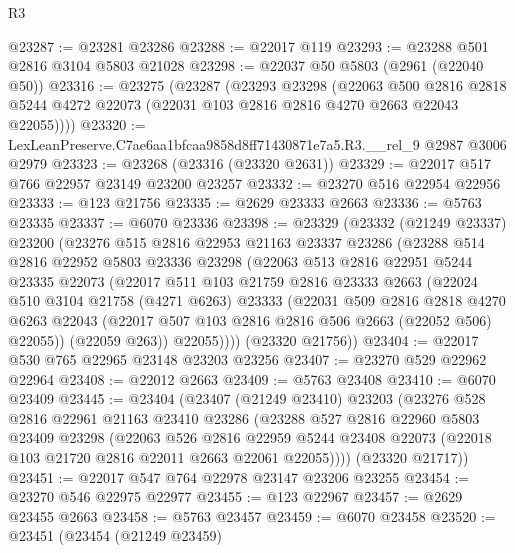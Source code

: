 \begin{lexlean}{R3}
\begin{coremodule}
@23287 := @23281 @23286
@23288 := @22017 @119
@23293 := @23288 @501 @2816 @3104 @5803 @21028
@23298 := @22037 @50 @5803 (@2961 (@22040 @50))
@23316 := @23275
    (@23287
      (@23293
        @23298
        (@22063
          @500
          @2816
          @2818
          @5244
          @4272
          @22073
          (@22031 @103 @2816 @2816 @4270 @2663 @22043 @22055))))
@23320 := LexLeanPreserve.C7ae6aa1bfcaa9858d8ff71430871e7a5.R3.__rel_9 @2987 @3006 @2979
@23323 := @23268 (@23316 (@23320 @2631))
@23329 := @22017 @517 @766 @22957 @23149 @23200 @23257
@23332 := @23270 @516 @22954 @22956
@23333 := @123 @21756
@23335 := @2629 @23333 @2663
@23336 := @5763 @23335
@23337 := @6070 @23336
@23398 := @23329
    (@23332
      (@21249 @23337)
      @23200
      (@23276
        @515
        @2816
        @22953
        @21163
        @23337
        @23286
        (@23288
          @514
          @2816
          @22952
          @5803
          @23336
          @23298
          (@22063
            @513
            @2816
            @22951
            @5244
            @23335
            @22073
            (@22017
              @511
              @103
              @21759
              @2816
              @23333
              @2663
              (@22024
                @510
                @3104
                @21758
                (@4271 @6263)
                @23333
                (@22031
                  @509
                  @2816
                  @2818
                  @4270
                  @6263
                  @22043
                  (@22017 @507 @103 @2816 @2816 @506 @2663 (@22052 @506) @22055))
                (@22059 @263))
              @22055))))
      (@23320 @21756))
@23404 := @22017 @530 @765 @22965 @23148 @23203 @23256
@23407 := @23270 @529 @22962 @22964
@23408 := @22012 @2663
@23409 := @5763 @23408
@23410 := @6070 @23409
@23445 := @23404
    (@23407
      (@21249 @23410)
      @23203
      (@23276
        @528
        @2816
        @22961
        @21163
        @23410
        @23286
        (@23288
          @527
          @2816
          @22960
          @5803
          @23409
          @23298
          (@22063
            @526
            @2816
            @22959
            @5244
            @23408
            @22073
            (@22018 @103 @21720 @2816 @22011 @2663 @22061 @22055))))
      (@23320 @21717))
@23451 := @22017 @547 @764 @22978 @23147 @23206 @23255
@23454 := @23270 @546 @22975 @22977
@23455 := @123 @22967
@23457 := @2629 @23455 @2663
@23458 := @5763 @23457
@23459 := @6070 @23458
@23520 := @23451
    (@23454
      (@21249 @23459)

\end{coremodule}
\end{lexlean}
